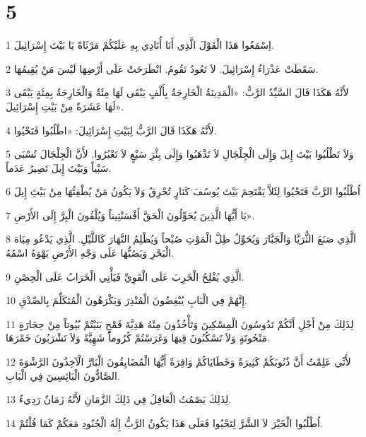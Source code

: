 \chapter{5}

\par 1 اِسْمَعُوا هَذَا الْقَوْلَ الَّذِي أَنَا أُنَادِي بِهِ عَلَيْكُمْ مَرْثَاةً يَا بَيْتَ إِسْرَائِيلَ.
\par 2 سَقَطَتْ عَذْرَاءُ إِسْرَائِيلَ. لاَ تَعُودُ تَقُومُ. انْطَرَحَتْ عَلَى أَرْضِهَا لَيْسَ مَنْ يُقِيمُهَا.
\par 3 لأَنَّهُ هَكَذَا قَالَ السَّيِّدُ الرَّبُّ: «الْمَدِينَةُ الْخَارِجَةُ بِأَلْفٍ يَبْقَى لَهَا مِئَةٌ وَالْخَارِجَةُ بِمِئَةٍ يَبْقَى لَهَا عَشَرَةٌ مِنْ بَيْتِ إِسْرَائِيلَ».
\par 4 لأَنَّهُ هَكَذَا قَالَ الرَّبُّ لِبَيْتِ إِسْرَائِيلَ: «اطْلُبُوا فَتَحْيُوا.
\par 5 وَلاَ تَطْلُبُوا بَيْتَ إِيلَ وَإِلَى الْجِلْجَالِ لاَ تَذْهَبُوا وَإِلَى بِئْرَِ سَبْعٍ لاَ تَعْبُرُوا. لأَنَّ الْجِلْجَالَ تُسْبَى سَبْياً وَبَيْتَ إِيلَ تَصِيرُ عَدَماً.
\par 6 اُطْلُبُوا الرَّبَّ فَتَحْيُوا لِئَلاَّ يَقْتَحِمَ بَيْتَ يُوسُفَ كَنَارٍ تُحْرِقُ وَلاَ يَكُونُ مَنْ يُطْفِئُهَا مِنْ بَيْتَِ إِيلَ
\par 7 يَا أَيُّهَا الَّذِينَ يُحَوِّلُونَ الْحَقَّ أَفْسَنْتِيناً وَيُلْقُونَ الْبِرَّ إِلَى الأَرْضِ».
\par 8 اَلَّذِي صَنَعَ الثُّرَيَّا وَالْجَبَّارَ وَيُحَوِّلُ ظِلَّ الْمَوْتِ صُبْحاً وَيُظْلِمُ النَّهَارَ كَاللَّيْلِ. الَّذِي يَدْعُو مِيَاهَ الْبَحْرِ وَيَصُبُّهَا عَلَى وَجْهِ الأَرْضِ يَهْوَهُ اسْمُهُ.
\par 9 الَّذِي يُفْلِحُ الْخَرِبَ عَلَى الْقَوِيِّ فَيَأْتِي الْخَرَابُ عَلَى الْحِصْنِ.
\par 10 إِنَّهُمْ فِي الْبَابِ يُبْغِضُونَ الْمُنْذِرَ وَيَكْرَهُونَ الْمُتَكَلِّمَ بِالصِّدْقِ.
\par 11 لِذَلِكَ مِنْ أَجْلِ أَنَّكُمْ تَدُوسُونَ الْمِسْكِينَ وَتَأْخُذُونَ مِنْهُ هَدِيَّةَ قَمْحٍ بَنَيْتُمْ بُيُوتاً مِنْ حِجَارَةٍ مَنْحُوتَةٍ وَلاَ تَسْكُنُونَ فِيهَا وَغَرَسْتُمْ كُرُوماً شَهِيَّةً وَلاَ تَشْرَبُونَ خَمْرَهَا.
\par 12 لأَنِّي عَلِمْتُ أَنَّ ذُنُوبَكُمْ كَثِيرَةٌ وَخَطَايَاكُمْ وَافِرَةٌ أَيُّهَا الْمُضَايِقُونَ الْبَارَّ الْآخِذُونَ الرَّشْوَةَ الصَّادُّونَ الْبَائِسِينَ فِي الْبَابِ.
\par 13 لِذَلِكَ يَصْمُتُ الْعَاقِلُ فِي ذَلِكَ الزَّمَانِ لأَنَّهُ زَمَانٌ رَدِيءٌ.
\par 14 اُطْلُبُوا الْخَيْرَ لاَ الشَّرَّ لِتَحْيُوا فَعَلَى هَذَا يَكُونُ الرَّبُّ إِلَهُ الْجُنُودِ مَعَكُمْ كَمَا قُلْتُمْ.

